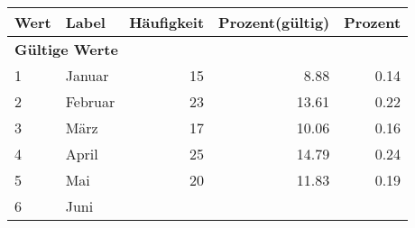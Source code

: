      \begin{longtable}{lXrrr}
     \toprule
     \textbf{Wert} & \textbf{Label} & \textbf{Häufigkeit} & \textbf{Prozent(gültig)} & \textbf{Prozent} \\
     \endhead
     \midrule
     \multicolumn{5}{l}{\textbf{Gültige Werte}}\\

     1 &
     \multicolumn{1}{X}{ Januar   } &


       \num{15} &
       \num[round-mode=places,round-precision=2]{8.88} &
         \num[round-mode=places,round-precision=2]{0.14} \\

     2 &
     \multicolumn{1}{X}{ Februar   } &


       \num{23} &
       \num[round-mode=places,round-precision=2]{13.61} &
         \num[round-mode=places,round-precision=2]{0.22} \\

     3 &
     \multicolumn{1}{X}{ März   } &


       \num{17} &
       \num[round-mode=places,round-precision=2]{10.06} &
         \num[round-mode=places,round-precision=2]{0.16} \\

     4 &
     \multicolumn{1}{X}{ April   } &


       \num{25} &
       \num[round-mode=places,round-precision=2]{14.79} &
         \num[round-mode=places,round-precision=2]{0.24} \\

     5 &
     \multicolumn{1}{X}{ Mai   } &


       \num{20} &
       \num[round-mode=places,round-precision=2]{11.83} &
         \num[round-mode=places,round-precision=2]{0.19} \\

     6 &
     \multicolumn{1}{X}{ Juni   } &



\end{longtable}
